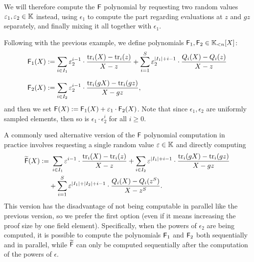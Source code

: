 We will therefore compute the $\textsf{F}$ polynomial by requesting two random values $\varepsilon_1,\varepsilon_2 \in \mathbb{K}$ instead, using $\epsilon_1$ to compute the part regarding evaluations at $z$ and $gz$ separately, and finally mixing it all together with $\epsilon_1$.

Following with the previous example, we define polynomials $\textsf{F}_1,\textsf{F}_2 \in \mathbb{K}_{<n}[X]$:
\begin{align*}
\textsf{F}_1(X) &:= \sum_{i \in I_1} \varepsilon_2^{i-1} \cdot \frac{\text{tr}_i(X) - \text{tr}_i(z)}{X - z} + \sum_{i=1}^S \varepsilon_2^{|I_1|+i-1} \cdot \frac{Q_i(X) - Q_i(z)}{X - z} \\[0.2cm]
\textsf{F}_2(X) &:= \sum_{i \in I_2} \varepsilon_2^{i-1} \cdot \frac{\text{tr}_i(gX) - \text{tr}_i(gz)}{X - gz},
\end{align*}
and then we set $\textsf{F}(X) := \textsf{F}_1(X) + \varepsilon_1 \cdot \textsf{F}_2(X)$. Note that since $\epsilon_1,\epsilon_2$ are uniformly sampled elements, then so is $\epsilon_1 \cdot \epsilon_2^i$ for all $i \geq0$. 

A commonly used alternative version of the $\textsf{F}$ polynomial computation in practice involves requesting a single random value $\varepsilon \in \mathbb{K}$ and directly computing
\begin{align*}
\widetilde{\textsf{F}}(X) := &~\sum_{i \in I_1} \varepsilon^{i-1} \cdot \frac{\text{tr}_i(X) - \text{tr}_i(z)}{X - z} + \sum_{i \in I_2} \varepsilon^{|I_1|+i-1} \cdot \frac{\text{tr}_i(gX) - \text{tr}_i(gz)}{X - gz} \\
& + \sum_{i=1}^S \varepsilon^{|I_1|+|I_2|+i-1} \cdot \frac{Q_i(X) - Q_i(z^S)}{X - z^S}.
\end{align*}
This version has the disadvantage of not being computable in parallel like the previous version, so we prefer the first option (even if it means increasing the proof size by one field element). Specifically, when the powers of $\epsilon_2$ are being computed, it is possible to compute the polynomials $\textsf{F}_1$ and $\textsf{F}_2$ both sequentially and in parallel, while $\widetilde{\textsf{F}}$ can only be computed sequentially after the computation of the powers of $\epsilon$.